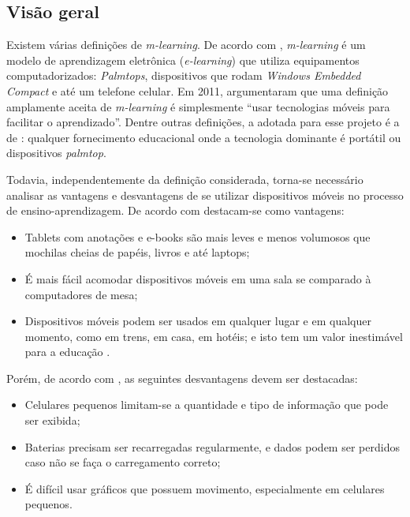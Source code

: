 \subsection{Visão geral}
Existem várias definições de \textit{m-learning}. %
De acordo com \cite{Quinn2000}, \textit{m-learning} é um modelo de aprendizagem eletrônica (\textit{e-learning}) que utiliza equipamentos computadorizados: \textit{Palmtops}, dispositivos que rodam \textit{Windows Embedded Compact} e até um telefone celular.
Em 2011, \cite{hwang2011research} argumentaram que uma definição amplamente aceita de \textit{m-learning} é simplesmente ``usar tecnologias móveis para facilitar o aprendizado''. Dentre outras definições, a adotada para esse projeto é a de \cite{traxler2005defining}: qualquer fornecimento educacional onde a tecnologia dominante é portátil ou dispositivos \textit{palmtop}.

Todavia, independentemente da definição considerada, torna-se necessário analisar as vantagens e desvantagens de se utilizar dispositivos móveis no processo de ensino-aprendizagem. De acordo com \cite{RICHAMEHTA2016} destacam-se como vantagens: 

\begin{itemize}
    \item Tablets com anotações e e-books são mais leves e menos volumosos que mochilas cheias de papéis, livros e até laptops;
    \item É mais fácil acomodar dispositivos móveis em uma sala se comparado à computadores de mesa;
    \item Dispositivos móveis podem ser usados em qualquer lugar e em qualquer momento, como em trens, em casa, em hotéis; e isto tem um valor inestimável para a educação \citep{CarmaMaia2008}.
\end{itemize}

Porém, de acordo com \cite{RICHAMEHTA2016}, as seguintes desvantagens devem ser destacadas: 

\begin{itemize}
    \item Celulares pequenos limitam-se a quantidade e tipo de informação que pode ser exibida;
    \item Baterias precisam ser recarregadas regularmente, e dados podem ser perdidos caso não se faça o carregamento correto;
    \item É difícil usar gráficos que possuem movimento, especialmente em celulares pequenos.
\end{itemize}

